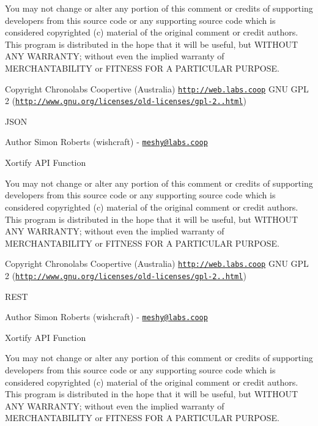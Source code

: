 You may not change or alter any portion of this comment or credits of supporting developers from this source code or any supporting source code which is considered copyrighted (c) material of the original comment or credit authors. This program is distributed in the hope that it will be useful, but W\-I\-T\-H\-O\-U\-T A\-N\-Y W\-A\-R\-R\-A\-N\-T\-Y; without even the implied warranty of M\-E\-R\-C\-H\-A\-N\-T\-A\-B\-I\-L\-I\-T\-Y or F\-I\-T\-N\-E\-S\-S F\-O\-R A P\-A\-R\-T\-I\-C\-U\-L\-A\-R P\-U\-R\-P\-O\-S\-E.

\begin{DoxyCopyright}{Copyright}
Chronolabs Coopertive (Australia) \href{http://web.labs.coop}{\tt http\-://web.\-labs.\-coop}  G\-N\-U G\-P\-L 2 (\href{http://www.gnu.org/licenses/old-licenses/gpl-2.0.html}{\tt http\-://www.\-gnu.\-org/licenses/old-\/licenses/gpl-\/2..\-html})
\end{DoxyCopyright}
J\-S\-O\-N \begin{DoxyAuthor}{Author}
Simon Roberts (wishcraft) -\/ \href{mailto:meshy@labs.coop}{\tt meshy@labs.\-coop}
\end{DoxyAuthor}
Xortify A\-P\-I Function

You may not change or alter any portion of this comment or credits of supporting developers from this source code or any supporting source code which is considered copyrighted (c) material of the original comment or credit authors. This program is distributed in the hope that it will be useful, but W\-I\-T\-H\-O\-U\-T A\-N\-Y W\-A\-R\-R\-A\-N\-T\-Y; without even the implied warranty of M\-E\-R\-C\-H\-A\-N\-T\-A\-B\-I\-L\-I\-T\-Y or F\-I\-T\-N\-E\-S\-S F\-O\-R A P\-A\-R\-T\-I\-C\-U\-L\-A\-R P\-U\-R\-P\-O\-S\-E.

\begin{DoxyCopyright}{Copyright}
Chronolabs Coopertive (Australia) \href{http://web.labs.coop}{\tt http\-://web.\-labs.\-coop}  G\-N\-U G\-P\-L 2 (\href{http://www.gnu.org/licenses/old-licenses/gpl-2.0.html}{\tt http\-://www.\-gnu.\-org/licenses/old-\/licenses/gpl-\/2..\-html})
\end{DoxyCopyright}
R\-E\-S\-T \begin{DoxyAuthor}{Author}
Simon Roberts (wishcraft) -\/ \href{mailto:meshy@labs.coop}{\tt meshy@labs.\-coop}
\end{DoxyAuthor}
Xortify A\-P\-I Function

You may not change or alter any portion of this comment or credits of supporting developers from this source code or any supporting source code which is considered copyrighted (c) material of the original comment or credit authors. This program is distributed in the hope that it will be useful, but W\-I\-T\-H\-O\-U\-T A\-N\-Y W\-A\-R\-R\-A\-N\-T\-Y; without even the implied warranty of M\-E\-R\-C\-H\-A\-N\-T\-A\-B\-I\-L\-I\-T\-Y or F\-I\-T\-N\-E\-S\-S F\-O\-R A P\-A\-R\-T\-I\-C\-U\-L\-A\-R P\-U\-R\-P\-O\-S\-E.

